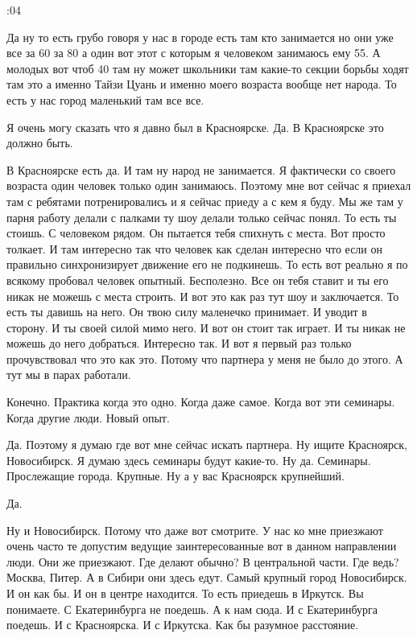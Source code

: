 :04

\I
Да ну то есть грубо говоря у нас в городе есть там кто занимается но они уже все за 60 за 80 а один вот этот с которым я человеком занимаюсь ему 55.
А молодых вот чтоб 40 там ну может школьники там какие-то секции борьбы ходят там это а именно Тайзи Цуань и именно моего возраста вообще нет народа.
То есть у нас город маленький там все все.

\A
Я очень могу сказать что я давно был в Красноярске.
Да.
В Красноярске это должно быть.

\I
В Красноярске есть да.
И там ну народ не занимается.
Я фактически со своего возраста один человек только один занимаюсь.
Поэтому мне вот сейчас я приехал там с ребятами потренировались и я сейчас приеду а с кем я буду.
Мы же там у парня работу делали с палками ту шоу делали только сейчас понял.
То есть ты стоишь.
С человеком рядом.
Он пытается тебя спихнуть с места.
Вот просто толкает.
И там интересно так что человек как сделан интересно что если он правильно синхронизирует движение его не подкинешь.
То есть вот реально я по всякому пробовал человек опытный.
Бесполезно.
Все он тебя ставит и ты его никак не можешь с места строить.
И вот это как раз тут шоу и заключается.
То есть ты давишь на него.
Он твою силу маленечко принимает.
И уводит в сторону.
И ты своей силой мимо него.
И вот он стоит так играет.
И ты никак не можешь до него добраться.
Интересно так.
И вот я первый раз только прочувствовал что это как это.
Потому что партнера у меня не было до этого.
А тут мы в парах работали.

\A
Конечно.
Практика когда это одно.
Когда даже самое.
Когда вот эти семинары.
Когда другие люди.
Новый опыт.

\I
Да.
Поэтому я думаю где вот мне сейчас искать партнера.
Ну ищите Красноярск, Новосибирск.
Я думаю здесь семинары будут какие-то.
Ну да.
Семинары.
Прослежащие города.
Крупные.
Ну а у вас Красноярск крупнейший.

\I
Да.

\A
Ну и Новосибирск.
Потому что даже вот смотрите.
У нас ко мне приезжают очень часто те допустим ведущие
заинтересованные вот в данном направлении люди.
Они же приезжают.
Где делают обычно?
В центральной части.
Где ведь?
Москва, Питер.
А в Сибири они здесь едут.
Самый крупный город Новосибирск.
И он как бы.
И он в центре находится.
То есть приедешь в Иркутск.
Вы понимаете.
С Екатеринбурга не поедешь.
А к нам сюда.
И с Екатеринбурга поедешь.
И с Красноярска.
И с Иркутска.
Как бы разумное расстояние.

